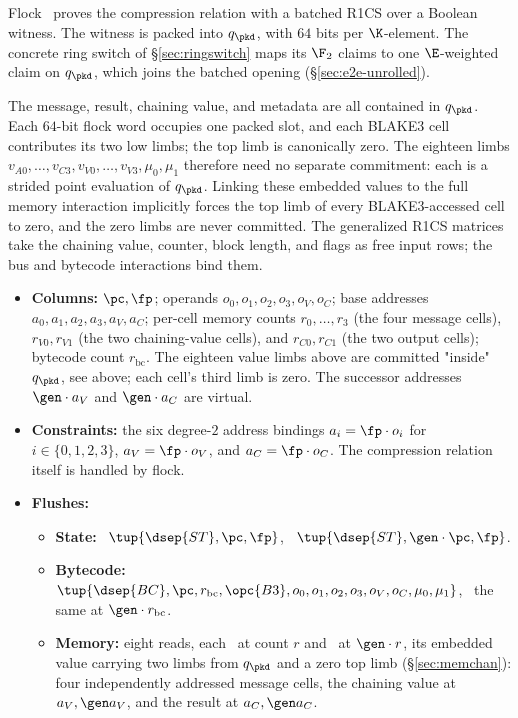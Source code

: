 Flock~\cite{flock-impl} proves the compression relation with a batched R1CS over a Boolean witness. The witness is packed into $q_\pkd$, with $64$ bits per $\K$-element. The concrete ring switch of \S\ref{sec:ringswitch} maps its $\F_2$ claims to one $\E$-weighted claim on $q_\pkd$, which joins the batched opening (\S\ref{sec:e2e-unrolled}).

The message, result, chaining value, and metadata are all contained in $q_\pkd$. Each $64$-bit flock word occupies one packed slot, and each BLAKE3 cell contributes its two low limbs; the top limb is canonically zero. The eighteen limbs $v_{A0},\dots,v_{C3},v_{V0},\dots,v_{V3},\mu_0,\mu_1$ therefore need no separate commitment: each is a strided point evaluation of $q_\pkd$. Linking these embedded values to the full memory interaction implicitly forces the top limb of every BLAKE3-accessed cell to zero, and the zero limbs are never committed. The generalized R1CS matrices take the chaining value, counter, block length, and flags as free input rows; the bus and bytecode interactions bind them.
\begin{itemize}
\item \textbf{Columns:} $\pc,\fp$; operands $o_0,o_1,o_2,o_3,o_V,o_C$; base addresses $a_0,a_1,a_2,a_3,a_V,a_C$; per-cell memory counts $r_0,\dots,r_3$ (the four message cells), $r_{V0},r_{V1}$ (the two chaining-value cells), and $r_{C0},r_{C1}$ (the two output cells); bytecode count $r_{\mathrm{bc}}$. The eighteen value limbs above are committed "inside" $q_\pkd$, see above; each cell's third limb is zero. The successor addresses $\gen\cdot a_V$ and $\gen\cdot a_C$ are virtual.
\item \textbf{Constraints:} the six degree-$2$ address bindings $a_i=\fp\cdot o_i$ for $i\in\{0,1,2,3\}$, $a_V=\fp\cdot o_V$, and $a_C=\fp\cdot o_C$. The compression relation itself is handled by flock.
\item \textbf{Flushes:}
  \begin{itemize}
  \item \textbf{State:} \pull\ $\tup{\dsep{ST},\pc,\fp}$, \push\ $\tup{\dsep{ST},\gen\cdot\pc,\fp}$.
  \item \textbf{Bytecode:} \pull\ $\tup{\dsep{BC},\pc,r_{\mathrm{bc}},\opc{B3},o_0,o_1,o_2,o_3,o_V,o_C,\mu_0,\mu_1}$, \push\ the same at $\gen\cdot r_{\mathrm{bc}}$.
  \item \textbf{Memory:} eight reads, each \pull\ at count $r$ and \push\ at $\gen\cdot r$, its embedded value carrying two limbs from $q_\pkd$ and a zero top limb (\S\ref{sec:memchan}): four independently addressed message cells, the chaining value at $a_V,\gen a_V$, and the result at $a_C,\gen a_C$.
  \end{itemize}
\end{itemize}
